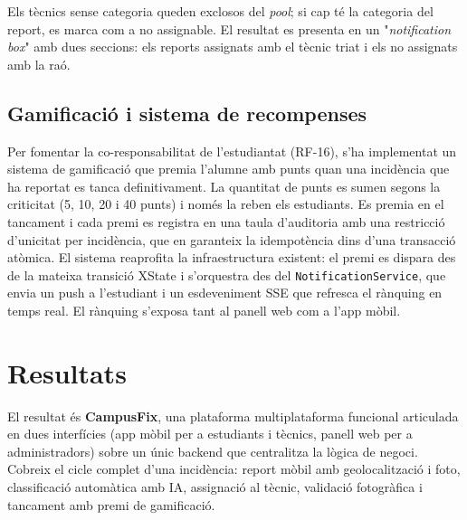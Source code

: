 \documentclass[10pt,a4paper,twocolumn,twoside]{article}
\begin{document}
		Els tècnics sense categoria queden exclosos del \textit{pool}; si cap té la categoria del report, es marca com a no assignable. El resultat es presenta en un "\textit{notification box}" amb dues seccions: els reports assignats amb el tècnic triat i els no assignats amb la raó.
		
		
		
		
		\subsection{Gamificació i sistema de recompenses}
		
		Per fomentar la co-responsabilitat de l'estudiantat (RF-16), s'ha implementat un sistema de gamificació que premia l'alumne amb punts quan una incidència que ha reportat es tanca definitivament. La quantitat de punts es sumen segons la criticitat (5, 10, 20 i 40 punts) i només la reben els estudiants. Es premia en el tancament i cada premi es registra en una taula d'auditoria amb una restricció d'unicitat per incidència, que en garanteix la idempotència dins d'una transacció atòmica. El sistema reaprofita la infraestructura existent: el premi es dispara des de la mateixa transició XState i s'orquestra des del \texttt{NotificationService}, que envia un push a l'estudiant i un esdeveniment SSE que refresca el rànquing en temps real. El rànquing s'exposa tant al panell web com a l'app mòbil.
		
		
		\section{Resultats}
		
		El resultat és \textbf{CampusFix}, una plataforma multiplataforma funcional articulada en dues interfícies (app mòbil per a estudiants i tècnics, panell web per a administradors) sobre un únic backend que centralitza la lògica de negoci. Cobreix el cicle complet d'una incidència: report mòbil amb geolocalització i foto, classificació automàtica amb IA, assignació al tècnic, validació fotogràfica i tancament amb premi de gamificació.
		
\end{document}
